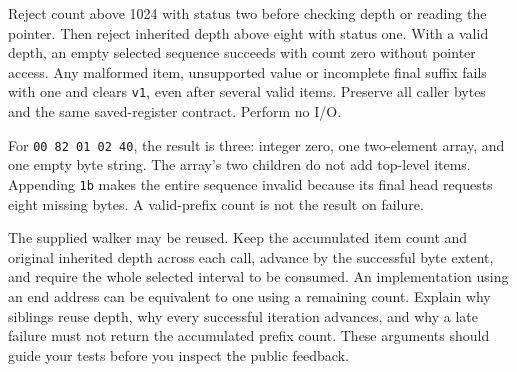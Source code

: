 Reject count above 1024 with status two before checking depth or reading the
pointer. Then reject inherited depth above eight with status one. With a valid
depth, an empty selected sequence succeeds with count zero without pointer
access. Any malformed item, unsupported value or incomplete final suffix fails
with one and clears \texttt{v1}, even after several valid items. Preserve all
caller bytes and the same saved-register contract. Perform no I/O.

For \texttt{00 82 01 02 40}, the result is three: integer zero, one two-element
array, and one empty byte string. The array's two children do not add top-level
items. Appending \texttt{1b} makes the entire sequence invalid because its final
head requests eight missing bytes. A valid-prefix count is not the result on
failure.

The supplied walker may be reused. Keep the accumulated item count and original
inherited depth across each call, advance by the successful byte extent, and
require the whole selected interval to be consumed. An implementation using an
end address can be equivalent to one using a remaining count. Explain why siblings
reuse depth, why every successful iteration advances, and why a late failure
must not return the accumulated prefix count. These arguments should guide your
tests before you inspect the public feedback.
